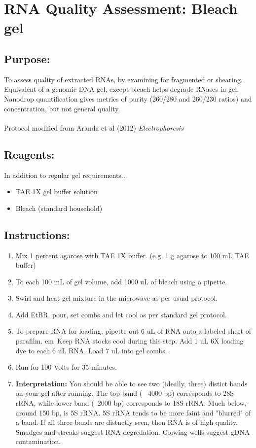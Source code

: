 \documentclass[a4paper,12pt,twoside]{book}
\begin{document}
	\thispagestyle{fancy}%
\section*{RNA Quality Assessment: Bleach gel}
 \subsection*{Purpose:}
To assess quality of extracted RNAs, by examining for fragmented or shearing. Equivalent of a genomic DNA gel, except bleach helps degrade RNases in gel. Nanodrop quantification gives metrics of purity (260/280 and 260/230 ratios) and concentration, but not general quality. 
\\
\\Protocol modified from Aranda et al (2012) {\em Electrophoresis}
\subsection*{Reagents:}
In addition to regular gel requirements...
\begin{itemize}
	\item TAE 1X gel buffer solution
	\item Bleach (standard household)
\end{itemize}
 \subsection*{Instructions:}
\begin{enumerate}
	\item Mix 1 percent agarose with TAE 1X buffer. (e.g. 1 g agarose to 100 mL TAE buffer)
	\item To each 100 mL of gel volume, add 1000 uL of bleach using a pipette. 
	\item Swirl and heat gel mixture in the microwave as per usual protocol. 
	\item Add EtBR, pour,  set combs and let cool as per standard gel protocol. 
	\item To prepare RNA for loading, pipette out 6 uL of RNA onto a labeled sheet of parafilm. {em\ Keep RNA stocks cool during this step.} Add 1 uL 6X loading dye to each 6 uL RNA. Load 7 uL into gel combs. 
	\item Run for 100 Volts for 35 minutes. 
	\item {\bf Interpretation:}
	You should be able to see two (ideally, three) distict bands on your gel after running. The top band (~ 4000 bp) corresponds to 28S rRNA, while lower band (~2000 bp) corresponds to 18S rRNA. Much below, around 150 bp, is 5S rRNA. 5S rRNA tends to be more faint and "blurred" of a band. If all three bands are distnctly seen, then RNA is of high quality. Smudges and streaks suggest RNA degredation. Glowing wells suggest gDNA contamination.  
	
	
\end{enumerate}
\end{document}
